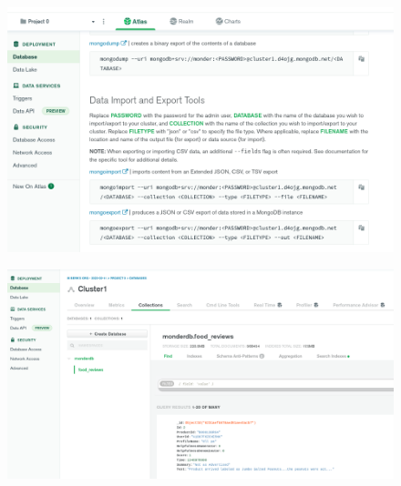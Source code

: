 \documentclass{beamer}
\begin{document}
\begin{frame}
    \begin{figure}
        \includegraphics[width=\textwidth]{../figures/mongo_import.png}
    \end{figure}
\end{frame}

\begin{frame}
    \begin{figure}
        \includegraphics[width=\textwidth]{../figures/mongo_cluster.png}
    \end{figure}
\end{frame}
\end{document}

